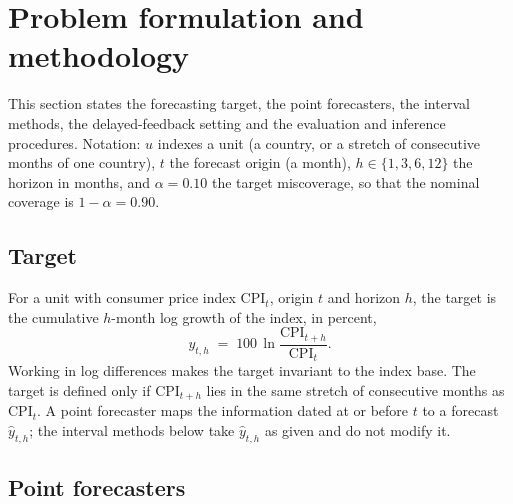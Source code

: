 \section{Problem formulation and methodology}\label{sec:method}

This section states the forecasting target, the point forecasters, the interval methods, the delayed-feedback setting and the evaluation and inference procedures. Notation: $u$ indexes a unit (a country, or a stretch of consecutive months of one country), $t$ the forecast origin (a month), $h\in\{1,3,6,12\}$ the horizon in months, and $\alpha=0.10$ the target miscoverage, so that the nominal coverage is $1-\alpha=0.90$.

\subsection{Target}\label{sec:target}

For a unit with consumer price index $\mathrm{CPI}_t$, origin $t$ and horizon $h$, the target is the cumulative $h$-month log growth of the index, in percent,
\begin{equation}\label{eq:target}
y_{t,h} \;=\; 100\,\ln\!\frac{\mathrm{CPI}_{t+h}}{\mathrm{CPI}_t}.
\end{equation}
Working in log differences makes the target invariant to the index base. The target is defined only if $\mathrm{CPI}_{t+h}$ lies in the same stretch of consecutive months as $\mathrm{CPI}_t$. A point forecaster maps the information dated at or before $t$ to a forecast $\hat y_{t,h}$; the interval methods below take $\hat y_{t,h}$ as given and do not modify it.

\subsection{Point forecasters}\label{sec:forecasters}

